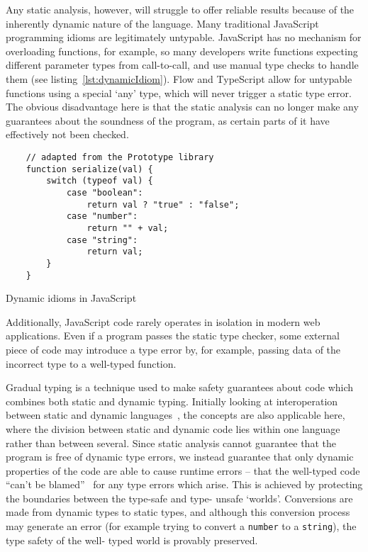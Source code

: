 \documentclass[12pt,a4paper,twoside,openright]{report}
\begin{document}
Any static analysis, however, will struggle to offer reliable results because
of the inherently dynamic nature of the language. Many traditional JavaScript
programming idioms are legitimately untypable. JavaScript has no
mechanism for overloading functions, for example, so many developers write
functions expecting different parameter types from call-to-call, and use manual
type checks to handle them (see listing~\ref{lst:dynamicIdiom}). Flow and
TypeScript allow for untypable functions using a special `any' type, which will
never trigger a static type error. The obvious disadvantage here is that the
static analysis can no longer make any guarantees about the soundness of the
program, as certain parts of it have effectively not been checked.
\begin{program}[t]
 \begin{verbatim}
 	// adapted from the Prototype library
 	function serialize(val) {
	 	switch (typeof val) {
		 	case "boolean":
			 	return val ? "true" : "false";
		 	case "number":
			 	return "" + val;
		 	case "string":
			 	return val;
	 	}
 	}	
 \end{verbatim}
 \label{lst:dynamicIdiom}
 \caption{Dynamic idioms in JavaScript}
\end{program}
Additionally, JavaScript code rarely operates in isolation in modern web
applications. Even if a program passes the static type checker, some external
piece of code may introduce a type error by, for example, passing data of the
incorrect type to a well-typed function.

Gradual typing is a technique used to make safety guarantees about code which
combines both static and dynamic typing. Initially looking at interoperation
between static and dynamic languages~\cite{gray2005fine}, the concepts are
also applicable here, where the division between static and dynamic code lies
within one language rather than between several. Since static analysis cannot
guarantee that the program is free of dynamic type errors, we instead
guarantee that only dynamic properties of the code are able to cause runtime
errors -- that the well-typed code ``can't be blamed''~\cite{cantblame} for
any type errors which arise. This is achieved by protecting the boundaries
between the type-safe and type- unsafe `worlds'. Conversions are made from
dynamic types to static types, and although this conversion process may
generate an error (for example trying to convert a \texttt{number} to a
\texttt{string}), the type safety of the well- typed world is provably
preserved.
\end{document}
